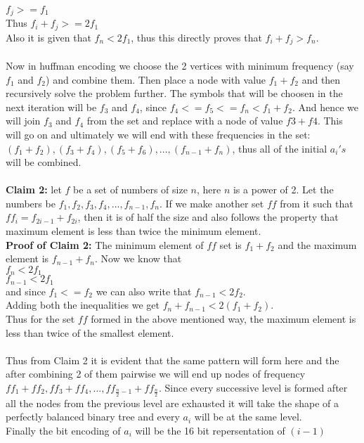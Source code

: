 \documentclass{article}
\begin{document}
$f_j >= f_1$\\
Thus $f_i+f_j >= 2f_1$\\ 
Also it is given that $f_n < 2f_1$, thus this directly proves that $f_i+ f_j > f_n$.
\\\\
Now in huffman encoding we choose the 2 vertices with minimum frequency (say $f_1$ and $f_2$) and combine them. Then place a node with value $f_1+f_2$ and then recursively solve the problem further. The symbols that will be choosen in the next iteration will be $f_3$ and $f_4$, since $f_4<= f_5<= f_n < f_1+ f_2$. And hence we will join $f_3$ and $f_4$ from the set and replace with a node of value $f3+f4$. This will go on and ultimately we will end with these frequencies in the set: $(f_1+f_2), (f_3+f_4), (f_5+f_6), ... ,(f_{n-1}+f_n)$, thus all of the initial $a_i's$ will be combined.
\\\\
\textbf{Claim 2:} let $f$ be a set of numbers of size $n$, here $n$ is a power of 2. Let the numbers be $f_1, f_2, f_3, f_4, ... ,f_{n-1}, f_n$. If we make another set $ff$ from it such that ${ff}_i = f_{2i-1} + f_{2i}$, then it is of half the size and also follows the property that maximum element is less than twice the minimum element. 
\\
\textbf{Proof of Claim 2:} The minimum element of $ff$ set is $f_1+f_2$ and the maximum element is $f_{n-1}+f_n$. Now we know that\\ 
$f_n < 2f_1$\\
$f_{n-1} < 2f_1$\\
and since $f_1 <= f_2$ we can also write that $f_{n-1} < 2f_2$.\\
Adding both the inequalities we get $f_n + f_{n-1} < 2(f_1+ f_2)$.\\
Thus for the set $ff$ formed in the above mentioned way, the maximum element is less than twice of the smallest element. 
\\\\
Thus from Claim 2 it is evident that the same pattern will form here and the after combining 2 of them pairwise we will end up nodes of frequency $ff_1+ff_2, ff_3+ff_4, ... , ff_{\frac{n}{2}-1}+ff_{\frac{n}{2}}$. Since every successive level is formed after all the nodes from the previous level are exhausted it will take the shape of a perfectly balanced binary tree and every $a_i$ will be at the same level.\\Finally the bit encoding of $a_i$ will be the 16 bit repersentation of $(i-1)$
\end{document}
